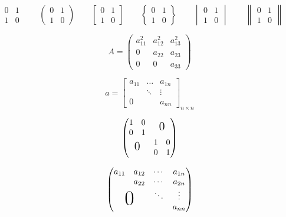 \documentclass{ctexart}
\begin{document}
	\[
	\begin{matrix}
	0&1\\
	1&0
	\end{matrix}\qquad
	\begin{pmatrix}
	0&1\\
	1&0
	\end{pmatrix}\qquad
	\begin{bmatrix}
	0&1\\
	1&0
	\end{bmatrix}\qquad
	\begin{Bmatrix}
	0&1\\
	1&0
	\end{Bmatrix}\qquad
	\begin{vmatrix}
	0&1\\
	1&0
	\end{vmatrix}\qquad
	\begin{Vmatrix}
	0&1\\
	1&0
	\end{Vmatrix}\qquad
	\]
	
	\[
	A = \begin{pmatrix}
	a_{11}^2 & a_{12}^2 & a_{13}^2\\
	0 & a_{22} & a_{23}\\
	0 & 0 & a_{33}
	\end{pmatrix}
	\]
	
	\[
	a = \begin{bmatrix}
	a_{11} & \dots & a_{1n}\\
	& \ddots & \vdots \\
	0 & & a_{nn}
	\end{bmatrix}_{n \times n}	%
	\]
	
	\[
	\begin{pmatrix}
	\begin{matrix}
	1 & 0\\0& 1
	\end{matrix}%
	& \text{\Large 0} \\ %
	\text{\Large 0} &
	\begin{matrix}
	1&0\\0&1
	\end{matrix}%
	\end{pmatrix}
	\]
	
	\[\begin{pmatrix}
	a_{11} & a_{12} & \cdots & a_{1n} \\
	& a_{22} & \cdots & a_{2n} \\
	&		 & \ddots & \vdots \\
	\multicolumn{2}{c}{\raisebox{1.3ex}[0pt]{\Huge 0}}
	&  		 &  a_{nn}
	\end{pmatrix}
	\]
	
\end{document}
